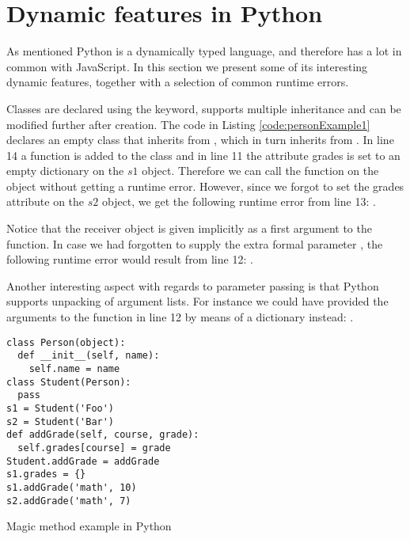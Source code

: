 \chapter{Dynamic features in Python}
As mentioned Python is a dynamically typed language, and therefore has a lot in common with JavaScript. 
In this section we present some of its interesting dynamic features, together with a selection of common runtime errors. 

Classes are declared using the  keyword, supports multiple inheritance and can be modified further after creation. 
The code in Listing \ref{code:personExample1} declares an empty  class that inherits from , 
which in turn inherits from . In line 14 a function  is added to the  
class and in line 11 the attribute grades is set to an empty dictionary on the $s1$ object. Therefore we can call the  
function on the  object without getting a runtime error. However, since we forgot to set the grades attribute on the $s2$ object, 
we get the following runtime error from line 13: . 

Notice that the receiver object is given implicitly as a first argument to the  function. 
In case we had forgotten to supply the extra formal parameter , the following runtime error would result from line 12:
. 

Another interesting aspect with regards to parameter passing is that Python supports unpacking of argument lists. 
For instance we could have provided the arguments to the  function in line 12 by means of a dictionary instead: 
.

\begin{listing}[H]
  \begin{verbatim}
class Person(object):
  def __init__(self, name):
    self.name = name
class Student(Person):
  pass
s1 = Student('Foo')
s2 = Student('Bar')
def addGrade(self, course, grade):
  self.grades[course] = grade
Student.addGrade = addGrade
s1.grades = {}
s1.addGrade('math', 10)
s2.addGrade('math', 7)
  \end{verbatim}
  \caption{Magic method example in Python}
  \label{code:personExample1}
\end{listing}

